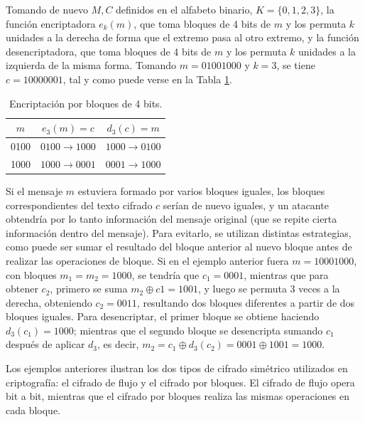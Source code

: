 \begin{ejs}
    \item Tomando de nuevo $M,C$ definidos en el alfabeto binario, $K = \{0,1,2,3\}$, la función encriptadora $e_k(m)$, que toma bloques de 4 bits de $m$ y los permuta $k$ unidades a la derecha de forma que el extremo pasa al otro extremo, y la función desencriptadora, que toma bloques de 4 bits de $m$ y los permuta $k$ unidades a la izquierda de la misma forma. Tomando $m = 01001000$ y $k = 3$, se tiene $c = 10000001$, tal y como puede verse en la Tabla \ref{tab:bloque_ejemplo1}.

    \begin{table}[H]
    \centering
    \setlength{\tabcolsep}{12pt}
    \begin{tabular}{ccc}
    \toprule
    $m$ & $e_3(m) = c$ & $d_3(c) = m$ \\
    \midrule
     0100 &$0100 \to 1000$& $1000 \to 0100$ \\
     1000 &$1000 \to 0001$& $0001 \to 1000$ \\
    \bottomrule
    \end{tabular}
\caption{Encriptación por bloques de 4 bits.}
\label{tab:bloque_ejemplo1}
\end{table}
Si el mensaje $m$ estuviera formado por varios bloques iguales, los bloques correspondientes del texto cifrado $c$ serían de nuevo iguales, y un atacante obtendría por lo tanto información del mensaje original (que se repite cierta información dentro del mensaje). Para evitarlo, se utilizan distintas estrategias, como puede ser sumar el resultado del bloque anterior al nuevo bloque antes de realizar las operaciones de bloque. Si en el ejemplo anterior fuera $m = 10001000$, con bloques $m_1 = m_2 = 1000$, se tendría que $c_1 = 0001$, mientras que para obtener $c_2$, primero se suma $m_2 \oplus c1 = 1001$, y luego se permuta 3 veces a la derecha, obteniendo $c_2 = 0011$, resultando dos bloques diferentes a partir de dos bloques iguales. Para desencriptar, el primer bloque se obtiene haciendo $d_3(c_1) = 1000$; mientras que el segundo bloque se desencripta sumando $c_1$ después de aplicar $d_3$, es decir,  $m_2 = c_1 \oplus d_3(c_2) = 0001 \oplus 1001 = 1000$.

\end{ejs}
Los ejemplos anteriores ilustran los dos tipos de cifrado simétrico utilizados en criptografía: el cifrado de flujo y el cifrado por bloques. El cifrado de flujo opera bit a bit, mientras que el cifrado por bloques realiza las mismas operaciones en cada bloque.
